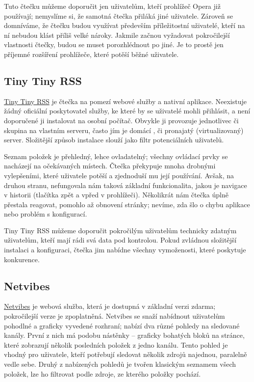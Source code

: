 Tuto čtečku můžeme doporučit jen uživatelům, kteří prohlížeč Opera již používají; nemyslíme si, že samotná čtečka přiláká jiné uživatele.
Zároveň se domníváme, že čtečku budou využívat především příležitostní uživatelé, kteří na ní nebudou klást příliš velké nároky.
Jakmile začnou vyžadovat pokročilejší vlastnosti čtečky, budou se muset porozhlédnout po jiné.
Je to prostě jen příjemné rozšíření prohlížeče, které potěší běžné uživatele.

\subsection{Tiny Tiny RSS}

\href{http://tt-rss.org/}{Tiny Tiny RSS} je čtečka na pomezí webové služby a nativní aplikace.
Neexistuje žádný oficiální poskytovatel služby, ke které by se uživatelé mohli přihlásit, a není doporučené ji instalovat na osobní počítač.
Obvykle ji provozuje jednotlivec či skupina na vlastním serveru, často jím je domácí , či pronajatý (virtualizovaný) server.
Složitější způsob instalace slouží jako filtr potenciálních uživatelů.

Seznam položek je přehledný, lehce ovladatelný; všechny ovládací prvky se nacházejí na očekávaných místech.
Čtečka překypuje mnoha drobnými vylepšeními, které uživatele potěší a zjednoduší mu její používání.
Avšak, na druhou stranu, nefungovala nám taková základní funkcionalita, jakou je navigace v historii (tlačítka zpět a vpřed v prohlížeči).
Několikrát nám čtečka úplně přestala reagovat, pomohlo až obnovení stránky; nevíme, zda šlo o chybu aplikace nebo problém s konfigurací.

Tiny Tiny RSS můžeme doporučit pokročilým uživatelům technicky zdatným uživatelům, kteří mají rádi svá data pod kontrolou.
Pokud zvládnou složitější instalaci a konfiguraci, čtečka jim nabídne všechny vymoženosti, které poskytuje konkurence.

\subsection{Netvibes}

\href{http://www.netvibes.com/}{Netvibes} je webová služba, která je dostupná v základní verzi zdarma; pokročilejší verze je zpoplatněná.
Netvibes se snaží nabídnout uživatelům pohodlné a graficky vyvedené rozhraní; nabízí dva různé pohledy na sledované kanály.
První z nich má podobu nástěnky -- graficky bohatých bloků na stránce, které zobrazují několik posledních položek z jedno kanálu.
Tento pohled je vhodný pro uživatele, kteří potřebují sledovat několik zdrojů najednou, paralelně vedle sebe.
Druhý z nabízených pohledů je tvořen klasickým seznamem všech položek, lze ho filtrovat podle zdroje, ze kterého položky pochází.

